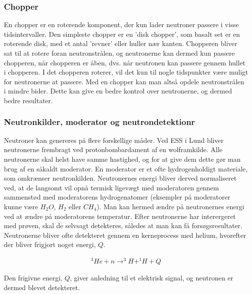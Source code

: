 \documentclass[12pt,oneside,a4paper]{article}
\begin{document}
{{{{{\subsubsection{Chopper}
En chopper er en roterende komponent, der kun lader neutroner passere i visse tidsintervaller. Den simpleste chopper er en 'disk chopper', som basalt set er en roterende disk, med et antal 'revner' eller huller nær kanten. Chopperen bliver sat til at rotere foran neutronstrålen, og neutronerne kan dermed kun passere chopperen, når chopperen er åben, dvs. når neutronen kan passere gennem hullet i chopperen. I det chopperen roterer, vil det kun til nogle tidspunkter være muligt for neutronerne at passere. Med en chopper kan man altså opdele neutronstrålen i mindre bider. Dette kan give en bedre kontrol over neutronerne, og dermed bedre resultater. \cite{ess_folder}

\subsubsection{Neutronkilder, moderator og neutrondetektionr}
Neutroner kan genereres på flere forskellige måder. Ved ESS i Lund bliver neutronerne frembragt ved protonbombardament af en wolframkilde. Alle neutronerne skal helst have samme hastighed, og for at give dem dette gør man brug af en såkaldt moderator. En moderator er et ofte hydrogenholdigt materiale, som omkrænser neutronkilden. Neutronernes energi bliver derved normaliseret ved, at de langsomt vil opnå termisk ligevægt med moderatoren gennem sammenstød med moderatorens hydrogenatomer (eksempler på moderatorer kunne være $H_2O$, $H_2$ eller $CH_4$). Man kan hermed ændre på neutronernes energi ved at ændre på moderatorens temperatur. 
Efter neutronerne har interergeret med prøven, skal de selvsagt detekteres, således at man kan få forsøgsresultater. Neutronerne 
bliver ofte detekteret gennem en kerneprocess med helium, hvorefter der bliver frigjort noget energi, $Q$. \cite{lefmann_arleth_kirkensgaard_lebech_thomsen}

\begin{align}
^3He + n \to  ^3H + ^1H + Q
\end{align}

Den frigivne energi, $Q$, giver anledning til et elektrisk signal, og neutronen er dermed blevet detekteret.


}}}}}
\end{document}
